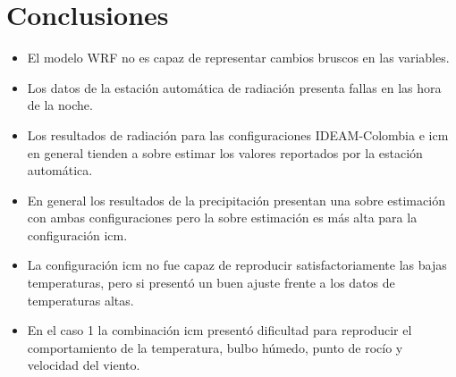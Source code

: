 \section{Conclusiones}

\begin{itemize}
    \item El modelo WRF no es capaz de representar cambios bruscos en las variables.
    \item Los datos de la estación automática de radiación presenta fallas en las hora de la noche.
    \item Los resultados de radiación para las configuraciones IDEAM-Colombia e icm en general tienden a sobre estimar los valores reportados por la estación automática.
    \item En general los resultados de la precipitación presentan una sobre estimación con ambas configuraciones pero la sobre estimación es más alta para la configuración icm.
    \item La configuración icm no fue capaz de reproducir satisfactoriamente las bajas temperaturas, pero si presentó un buen ajuste frente a los datos de temperaturas altas.
    \item En el caso 1 la combinación icm presentó dificultad para reproducir el comportamiento de la temperatura, bulbo húmedo, punto de rocío y velocidad del viento.
\end{itemize}
